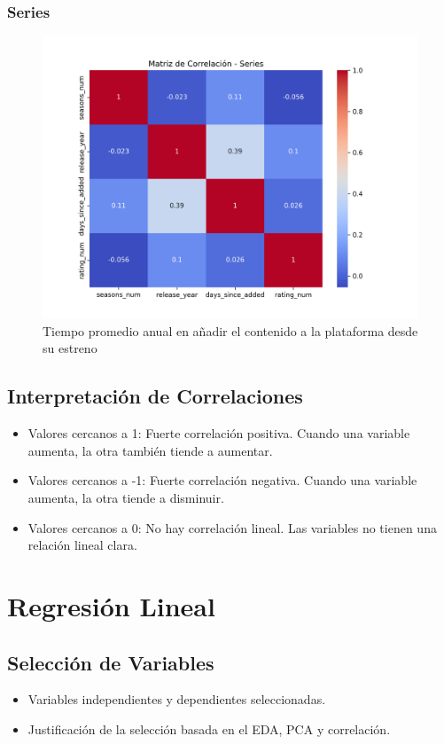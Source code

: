 \documentclass{article}
\begin{document}
\subsubsection{Series}
\begin{figure}[H]
	\centering
	\includegraphics[width=\textwidth]{Graphs/matriz_correlacion_series.png}
	\caption{Tiempo promedio anual en añadir el contenido a la plataforma desde su estreno }
	\label{fig:matriz_correlacion_series}
\end{figure}



\subsection{Interpretación de Correlaciones}
\begin{itemize}
    \item Valores cercanos a 1: Fuerte correlación positiva. Cuando una variable aumenta, la otra también tiende a aumentar.
    \item Valores cercanos a -1: Fuerte correlación negativa. Cuando una variable aumenta, la otra tiende a disminuir.
    \item Valores cercanos a 0: No hay correlación lineal. Las variables no tienen una relación lineal clara.
\end{itemize}

\section{Regresión Lineal}
\subsection{Selección de Variables}
\begin{itemize}
    \item Variables independientes y dependientes seleccionadas.
    \item Justificación de la selección basada en el EDA, PCA y correlación.
\end{itemize}
\end{document}

